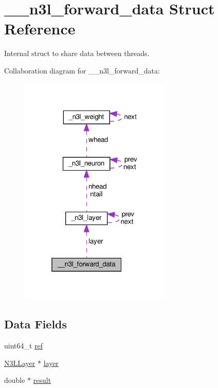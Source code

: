 \hypertarget{struct____n3l__forward__data}{}\section{\+\_\+\+\_\+n3l\+\_\+forward\+\_\+data Struct Reference}
\label{struct____n3l__forward__data}


Internal struct to share data between threads.  




Collaboration diagram for \+\_\+\+\_\+n3l\+\_\+forward\+\_\+data\+:\nopagebreak
\begin{figure}[H]
\begin{center}
\leavevmode
\includegraphics[width=205pt]{struct____n3l__forward__data__coll__graph}
\end{center}
\end{figure}
\subsection*{Data Fields}
\begin{DoxyCompactItemize}
\item 
uint64\+\_\+t \hyperlink{struct____n3l__forward__data_ada78b9bd1418f8dccab76319afb7d64b}{ref}
\item 
\hyperlink{n3__header_8h_a9ee3a7104816bdb6222148cfe9ca8ad9}{N3\+L\+Layer} $\ast$ \hyperlink{struct____n3l__forward__data_aaeb45910cc54c7f3a770dbd124477fc2}{layer}
\item 
double $\ast$ \hyperlink{struct____n3l__forward__data_ac870eae5ce14b297b5d78cc7112c8cec}{result}
\end{DoxyCompactItemize}


